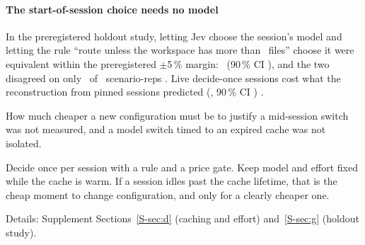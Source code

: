 \paragraph{The start-of-session choice needs no model} In the preregistered holdout study, letting Jev choose the session's
model and letting the rule ``route unless the workspace has more than \AoScopeFiles\ files'' choose it were
equivalent within the preregistered $\pm$5\,\% margin: \SHTwoRatio\X\ (90\,\% CI \SHTwoCINinety), and the two disagreed on only \SHTwoDisc\ of \SHTwoReps\
scenario-reps \prereg. Live decide-once sessions cost what the reconstruction from pinned sessions predicted
(\SHSixRatio\X, 90\,\% CI \SHSixCINinety) \prereg.

How much cheaper a new configuration must be to justify a mid-session switch was not measured, and a model switch
timed to an expired cache was not isolated.

\begin{keyidea}[title={For practitioners}]
Decide once per session with a rule and a price gate. Keep model and effort fixed while the cache is warm. If a
session idles past the cache lifetime, that is the cheap moment to change configuration, and only for a clearly
cheaper one.
\end{keyidea}

Details: Supplement Sections~\ref{S-sec:d} (caching and effort) and~\ref{S-sec:g} (holdout study).
